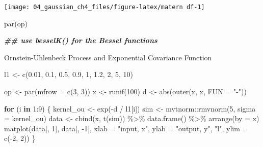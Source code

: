 \documentclass[
]{article}
\newenvironment{Shaded}{\begin{snugshade}}{\end{snugshade}}
\newcommand{\AttributeTok}[1]{\textcolor[rgb]{0.77,0.63,0.00}{#1}}
\newcommand{\ControlFlowTok}[1]{\textcolor[rgb]{0.13,0.29,0.53}{\textbf{#1}}}
\newcommand{\DecValTok}[1]{\textcolor[rgb]{0.00,0.00,0.81}{#1}}
\newcommand{\DocumentationTok}[1]{\textcolor[rgb]{0.56,0.35,0.01}{\textbf{\textit{#1}}}}
\newcommand{\FloatTok}[1]{\textcolor[rgb]{0.00,0.00,0.81}{#1}}
\newcommand{\FunctionTok}[1]{\textcolor[rgb]{0.00,0.00,0.00}{#1}}
\newcommand{\NormalTok}[1]{#1}
\newcommand{\OtherTok}[1]{\textcolor[rgb]{0.56,0.35,0.01}{#1}}
\newcommand{\SpecialCharTok}[1]{\textcolor[rgb]{0.00,0.00,0.00}{#1}}
\newcommand{\StringTok}[1]{\textcolor[rgb]{0.31,0.60,0.02}{#1}}
\begin{document}
\begin{center}\texttt{[image: 04\_gaussian\_ch4\_files/figure-latex/matern df-1]} \end{center}

\begin{Shaded}
\begin{Highlighting}[]
\FunctionTok{par}\NormalTok{(op)}

\DocumentationTok{\#\# use besselK() for the Bessel functions}
\end{Highlighting}
\end{Shaded}

Ornstein-Uhlenbeck Process and Exponential Covariance Function

\begin{Shaded}
\begin{Highlighting}[]
\NormalTok{l1 }\OtherTok{\textless{}{-}} \FunctionTok{c}\NormalTok{(}\FloatTok{0.01}\NormalTok{, }\FloatTok{0.1}\NormalTok{,  }\FloatTok{0.5}\NormalTok{,}
         \FloatTok{0.9}\NormalTok{,   }\DecValTok{1}\NormalTok{,  }\FloatTok{1.2}\NormalTok{, }
           \DecValTok{2}\NormalTok{,   }\DecValTok{5}\NormalTok{,  }\DecValTok{10}\NormalTok{)}

\NormalTok{op }\OtherTok{\textless{}{-}} \FunctionTok{par}\NormalTok{(}\AttributeTok{mfrow =} \FunctionTok{c}\NormalTok{(}\DecValTok{3}\NormalTok{, }\DecValTok{3}\NormalTok{))}
\NormalTok{x }\OtherTok{\textless{}{-}} \FunctionTok{runif}\NormalTok{(}\DecValTok{100}\NormalTok{)}
\NormalTok{d }\OtherTok{\textless{}{-}} \FunctionTok{abs}\NormalTok{(}\FunctionTok{outer}\NormalTok{(x, x, }\AttributeTok{FUN =} \StringTok{"{-}"}\NormalTok{))}

\ControlFlowTok{for}\NormalTok{ (i }\ControlFlowTok{in} \DecValTok{1}\SpecialCharTok{:}\DecValTok{9}\NormalTok{) \{}
\NormalTok{  kernel\_ou }\OtherTok{\textless{}{-}} \FunctionTok{exp}\NormalTok{(}\SpecialCharTok{{-}}\NormalTok{d }\SpecialCharTok{/}\NormalTok{ l1[i]) }
\NormalTok{  sim }\OtherTok{\textless{}{-}}\NormalTok{ mvtnorm}\SpecialCharTok{::}\FunctionTok{rmvnorm}\NormalTok{(}\DecValTok{5}\NormalTok{, }\AttributeTok{sigma =}\NormalTok{ kernel\_ou)}
\NormalTok{  data }\OtherTok{\textless{}{-}} \FunctionTok{cbind}\NormalTok{(x, }\FunctionTok{t}\NormalTok{(sim)) }\SpecialCharTok{\%\textgreater{}\%} 
    \FunctionTok{data.frame}\NormalTok{() }\SpecialCharTok{\%\textgreater{}\%}
    \FunctionTok{arrange}\NormalTok{(}\AttributeTok{by =}\NormalTok{ x)}
  \FunctionTok{matplot}\NormalTok{(data[, }\DecValTok{1}\NormalTok{], data[, }\SpecialCharTok{{-}}\DecValTok{1}\NormalTok{], }
          \AttributeTok{xlab =} \StringTok{"input, x"}\NormalTok{, }\AttributeTok{ylab =} \StringTok{"output, y"}\NormalTok{, }
          \StringTok{"l"}\NormalTok{, }\AttributeTok{ylim =} \FunctionTok{c}\NormalTok{(}\SpecialCharTok{{-}}\DecValTok{2}\NormalTok{, }\DecValTok{2}\NormalTok{))}
\NormalTok{\}}
\end{Highlighting}
\end{Shaded}
\end{document}
